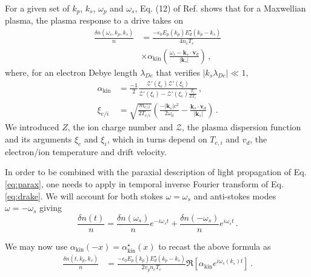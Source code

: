 \documentclass[
 reprint,
 amsmath,amssymb,
 aps,
]{revtex4-1}
\begin{document}
For a given set of $k_p$, $k_s$, $\omega_p$ and $\omega_s$, Eq. (12) of  Ref. \cite[]{POF_Drake_1973} shows that  for  a Maxwellian plasma, the plasma response to a drive  takes on 
\begin{align}
 \frac{ \delta n (\omega_s, k_p,k_s) }{n}  &=   \frac{ -\epsilon_0 E_p(k_p) E_d^\star(k_p-k_s) }{ 4 n_c T_e } \nonumber \\  &\times \alpha_\mathrm{kin}\left(\frac{\omega_s- \mathbf{k}_s\cdot \mathbf{v}_d}{\vert \mathbf{k}_s \vert }\right)   \, ,\label{eq:drake}
 \end{align}
 where, for an electron Debye length $\lambda_{De}$ that verifies $\vert k_s \lambda_{De} \vert \ll 1$, %
 \begin{align}
\alpha_\mathrm{kin} &=  \frac{-1}{2}\frac{ \mathcal{Z}'( \xi_e)\mathcal{Z}'( \xi_i)    }{   \mathcal{Z}'( \xi_i) - \mathcal{Z}'( \xi_e)\frac{  T_i }{ ZT_e } }    \, , \label{eq:drakea}\\
\xi_{e/i } &=  \sqrt{ \frac{ m_{e/i } }{ 2T_{e/i }}  } \left( \frac{ -\vert \mathbf{k}_s\vert c^2  }{  2\omega_0 }  - \frac{    \mathbf{k}_s \cdot \mathbf{v}_d }{  \vert \mathbf{k}_s\vert }\right)  \label{eq:xiie}   \,  .
\end{align}
We introduced $Z$, the ion charge number and  $ \mathcal{Z}$, the plasma dispersion function \cite{Fried_Gell-Mann_1960} and its arguments $\xi_{e } $ and $\xi_{i }$, which in turns depend on $T_{e,i}$ and $v_d$, the electron/ion temperature and  drift velocity.

In order to be combined with the paraxial description of light propagation of Eq. \eqref{eq:parax}, one needs to apply in temporal inverse Fourier transform of Eq. \eqref{eq:drake}. We will account for both stokes $\omega=\omega_s$ and anti-stokes modes $\omega=-\omega_s$ giving 
\begin{equation}\label{eq:sa}
     \frac{ \delta n (t) }{n}= \frac{ \delta n (\omega_s) }{n}e^{-i\omega_st} + \frac{ \delta n (-\omega_s) }{n}e^{i\omega_st}\, .
\end{equation}

We may now use $\alpha_\mathrm{kin}(-x) = \alpha^\star_\mathrm{kin}(x) $ to recast the above formula as 
\begin{align}
\frac{ \delta n (t,k_p,k_s ) }{n}  &=   \frac{ -\epsilon_0 E_p(k_p) E_d^\star(k_p-k_s)  }{ 2 v_g n_c T_e } 
 \Re \left[ \alpha_\mathrm{kin}  e^{ i\omega_s(k_s) t} \right]  \, .\label{eq:drakef}
\end{align}
\end{document}
